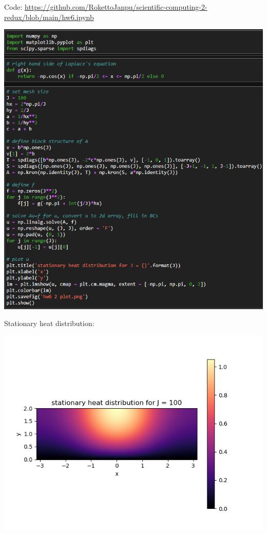 \documentclass{article}
\begin{document}
\begin{enumerate}
\begin{enumerate}
	Code: \url{https://github.com/RokettoJanpu/scientific-computing-2-redux/blob/main/hw6.ipynb}
	\begin{center}
		\includegraphics[scale=.6]{hw6 2 code}
	\end{center}
	Stationary heat distribution:
	\begin{center}
		\includegraphics[scale=1]{hw6 2 plot}
	\end{center}
\end{enumerate}
\end{enumerate}
\end{document}
